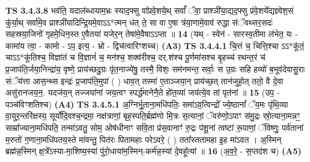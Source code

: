 \documentclass[17pt]{extarticle}
\begin{document}
                  \newline
                                \textbf{ TS 3.4.3.8} \newline
                  भव॑ति॒ यदाल॑ब्धायाम॒भ्रः स्याद॒फ्सु वा᳚प्रवे॒शये॒थ् सर्वां᳚ ॅवा॒ प्राश्ञी॑या॒द्यद॒फ्सु प्र॑वे॒शये᳚द्यज्ञ्वेश॒सं कु॑र्या॒थ् सर्वा॑मे॒व प्राश्ञी॑यादिन्द्रि॒यमे॒वाऽऽ*त्मन् ध॑त् ते॒ सा वा ए॒षा त्र॑या॒णामे॒वाव॑ रुद्धा संॅवथ्सर॒सदः॑ सहस्रया॒जिनो॑ गृहमे॒धिन॒स्त ए॒वैतया॑ यजेर॒न् तेषा॑मे॒वैषाऽऽप्ता ॥ \textbf{  14} \newline
                  \newline
                      (यथ् - स्वेन॑ - सारस्व॒तीमा ल॑भेत॒ यः - कामा॑य त्वा॒ - कामो - ऽप॒ इत्य॒ - भ्रो - द्विच॑त्वारिꣳशच्च)  \textbf{(A3)} \newline \newline
                                        \textbf{ TS 3.4.4.1} \newline
                  चि॒त्तं च॒ चित्ति॒श्चा ऽऽ*कू॑तं॒ चाऽऽ*कू॑तिश्च॒ विज्ञा॑तं च वि॒ज्ञानं॑ च॒ मन॑श्च॒ शक्व॑रीश्च॒ दर्.श॑श्च पू॒र्णमा॑सश्च बृ॒हच्च॑ रथन्त॒रं च॑ प्र॒जाप॑ति॒र्जया॒निन्द्रा॑य॒ वृष्णे॒ प्राय॑च्छदु॒ग्रः पृ॑त॒नाज्ये॑षु॒ तस्मै॒ विशः॒ सम॑नमन्त॒ सर्वाः॒ स उ॒ग्रः सहि हव्यो॑ ब॒भूव॑देवासु॒राः संॅय॑त्ता आस॒न्थ्स इन्द्रः॑ प्र॒जाप॑ति॒मुपा॑ ( ) धाव॒त् तस्मा॑ ए॒ताञ्जया॒न् प्राय॑च्छ॒त् तान॑जुहो॒त् ततो॒ वै दे॒वा असु॑रानजय॒न॒. यदज॑य॒न् तज्जया॑नां जय॒त्वꣳ स्पर्द्ध॑मानेनै॒ते हो॑त॒व्या॑ जय॑त्ये॒व तां पृत॑नां ॥ \textbf{  15} \newline
                  \newline
                      (उप॒ - पञ्च॑विꣳशतिश्च)  \textbf{(A4)} \newline \newline
                                        \textbf{ TS 3.4.5.1} \newline
                  अ॒ग्निर्भू॒ताना॒मधि॑पतिः॒ समा॑ऽव॒त्विन्द्रो᳚ ज्ये॒ष्ठानां᳚ ॅय॒मः पृ॑थि॒व्या वा॒युर॒न्तरि॑क्षस्य॒ सूर्यो॑दि॒वश्च॒न्द्रमा॒ नक्ष॑त्राणां॒ बृह॒स्पति॒र्ब्रह्म॑णो मि॒त्रः स॒त्यानां॒ ॅवरु॑णो॒ऽपाꣳ स॑मु॒द्रः स्रो॒त्याना॒मन्नꣳ॒॒ साम्रा᳚ज्याना॒मधि॑पति॒ तन्मा॑ऽवतु॒ सोम॒ ओष॑धीनाꣳ सवि॒ता प्र॑स॒वानाꣳ॑ रु॒द्रः प॑शू॒नां त्वष्टा॑ रू॒पाणां॒ ॅविष्णुः॒ पर्व॑तानां म॒रुतो॑ ग॒णाना॒मधि॑पतय॒स्ते मा॑वन्तु॒ पित॑रः पितामहाः परेऽवरे॒ ( ) तता᳚स्ततामहा इ॒ह मा॑ऽवत । अ॒स्मिन् ब्रह्म॑न्न॒स्मिन् क्ष॒त्रे᳚ऽस्या-मा॒शिष्य॒स्यां पु॑रो॒धाया॑म॒स्मिन्-कर्म॑न्न॒स्यां दे॒वहू᳚त्यां ॥ \textbf{  16} \newline
                  \newline
                      (अ॒व॒रे॒ - स॒प्तद॑श च)  \textbf{(A5)} \newline \newline
\end{document}
